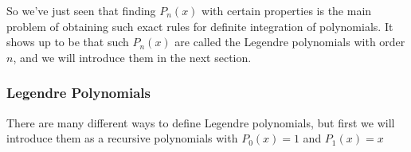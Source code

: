 \documentclass[paper=a4, fontsize=11pt]{scrartcl}
\begin{document}
So we've just seen that finding $P_n(x)$ with certain properties is the main problem of obtaining such exact rules for definite integration of polynomials. It shows up to be that such $P_n(x)$ are called the Legendre polynomials with order $n$, and we will introduce them in the next section.\\

\vspace{0.15in}
\subsubsection{Legendre Polynomials}
\vspace{0.15in}

There are many different ways to define Legendre polynomials, but first we will introduce them as a recursive polynomials with $P_0(x) = 1$ and $P_1(x) =x$
\end{document}

